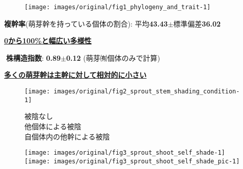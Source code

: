 \documentclass[a0, 36pt, plainboxedsections]{sciposter} %
\begin{document}
\begin{multicols}{2}

\begin{mdframed}[style=subsection.frame,frametitle={\textbf{\huge{\ding{192}}\LARGE{株構造は種間で大きく異なる}}}]

\vspace{-1.0em}
\begin{figure}
  \centering
    \texttt{[image: images/original/fig1\_phylogeny\_and\_trait-1]}
\end{figure}

\vspace{-1em}
\faCaretRight \textbf{複幹率}{\small(萌芽幹を持っている個体の割合): 平均}\textbf{43.43$\pm$}{\small 標準偏差}\textbf{36.02}

\hspace*{1.0em}\faHandLeft \textbf{\underline{0から100\%と幅広い多様性}}

\faCaretRight \textbf{株構造指数}: \textbf{0.89$\pm$0.12} {\small(萌芽㈲個体のみで計算)}

\hspace*{1.0em}\faHandLeft \textbf{\underline{多くの萌芽幹は主幹に対して相対的に小さい}}

\end{mdframed}

\begin{mdframed}[style=subsection.frame,frametitle=\textbf{\huge{\ding{194}}\LARGE{萌芽性が強いほど自己被陰を回避}}]

\vspace{-1.0em}
\begin{figure}
 \begin{minipage}{0.25\hsize}
  \centering
   \texttt{[image: images/original/fig2\_sprout\_stem\_shading\_condition-1]}
   
  \flushleft 
    {\tiny \textcolor[HTML]{4D4D4D}{\faStop} 被陰なし\\
    \textcolor[HTML]{C0C0C0}{\faStop} 他個体による被陰\\
    \vspace{-1.6em}\textcolor[HTML]{FFFFFF}{\faStop} 自個体内の他幹による被陰}
 \end{minipage}
 \begin{minipage}{0.75\hsize}
  \centering
   \texttt{[image: images/original/fig3\_sprout\_shoot\_self\_shade-1]}
   \texttt{[image: images/original/fig3\_sprout\_shoot\_self\_shade\_pic-1]}
   

\end{minipage}
\end{figure}
\end{mdframed}
\end{multicols}
\end{document}
